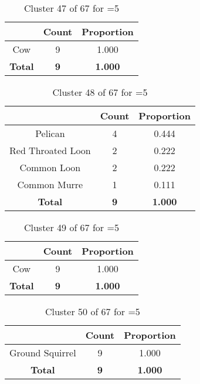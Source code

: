 \begin{table}[ht!]
\centering
\begin{tabular}{|c|c|c|}
\hline
\bf \Spec{} &\bf Count &\bf Proportion\\ \hline \hline
Cow & 9 & 1.000\\ \hline
\hline
\bf Total & \bf 9 & \bf 1.000\\ \hline
\end{tabular}
\label{tab:cluster:47:5}
\caption{Cluster 47 of 67 for \minneigh{}=5}
\end{table}

\begin{table}[ht!]
\centering
\begin{tabular}{|c|c|c|}
\hline
\bf \Spec{} &\bf Count &\bf Proportion\\ \hline \hline
Pelican & 4 & 0.444\\ \hline
Red Throated Loon & 2 & 0.222\\ \hline
Common Loon & 2 & 0.222\\ \hline
Common Murre & 1 & 0.111\\ \hline
\hline
\bf Total & \bf 9 & \bf 1.000\\ \hline
\end{tabular}
\label{tab:cluster:48:5}
\caption{Cluster 48 of 67 for \minneigh{}=5}
\end{table}

\begin{table}[ht!]
\centering
\begin{tabular}{|c|c|c|}
\hline
\bf \Spec{} &\bf Count &\bf Proportion\\ \hline \hline
Cow & 9 & 1.000\\ \hline
\hline
\bf Total & \bf 9 & \bf 1.000\\ \hline
\end{tabular}
\label{tab:cluster:49:5}
\caption{Cluster 49 of 67 for \minneigh{}=5}
\end{table}

\clearpage
\begin{table}[ht!]
\centering
\begin{tabular}{|c|c|c|}
\hline
\bf \Spec{} &\bf Count &\bf Proportion\\ \hline \hline
Ground Squirrel & 9 & 1.000\\ \hline
\hline
\bf Total & \bf 9 & \bf 1.000\\ \hline
\end{tabular}
\label{tab:cluster:50:5}
\caption{Cluster 50 of 67 for \minneigh{}=5}
\end{table}

